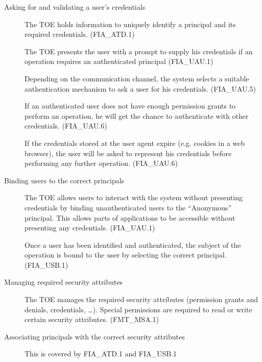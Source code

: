 \documentclass[10pt,a4paper,english]{scrbook}
\begin{document}
    \begin{description}
        \item[Asking for and validating a user's credentials]

            The TOE holds information to uniquely identify a principal and its
            required credentials. (FIA\_ATD.1) 
            
            The TOE presents the user with a prompt to supply his credentials
            if an operation requires an authenticated principal (FIA\_UAU.1)

            Depending on the communication channel, the system selects a
            suitable authentication mechanism to ask a user for his
            credentials. (FIA\_UAU.5)

            If an authenticated user does not have enough permission grants to
            perform an operation, he will get the chance to authenticate with
            other credentials. (FIA\_UAU.6)

            If the credentials stored at the user agent expire (e.g. cookies in
            a web browser), the user will be asked to represent his credentials
            before performing any further operation. (FIA\_UAU.6)

        \item[Binding users to the correct principals]

            The TOE allows users to interact with the system without presenting
            credentials by binding unauthenticated users to the ``Anonymous''
            principal. This allows parts of applications to be accessible without
            presenting any credentials. (FIA\_UAU.1)

            Once a user has been identified and authenticated, the subject of
            the operation is bound to the user by selecting the correct
            principal. (FIA\_USB.1)

        \item[Managing required security attributes]

            The TOE manages the required security attributes (permission grants
            and denials, credentials, \dots). Special permissions are required
            to read or write certain security attributes. (FMT\_MSA.1)

        \item[Associating principals with the correct security attributes]

            This is covered by FIA\_ATD.1 and FIA\_USB.1

    \end{description}
\end{document}
